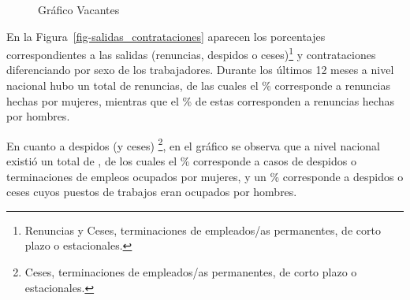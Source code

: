 \documentclass[
  11pt,
]{article}
\begin{document}
\begin{figure}[H]

\caption{\label{fig-vacantes}Gráfico Vacantes}


\end{figure}%

En la Figura~\ref{fig-salidas_contrataciones} aparecen los porcentajes
correspondientes a las salidas (renuncias, despidos o ceses)\footnote{Renuncias
  y Ceses, terminaciones de empleados/as permanentes, de corto plazo o
  estacionales.} y contrataciones diferenciando por sexo de los
trabajadores. Durante los últimos 12 meses a nivel nacional hubo un
total de  renuncias, de las cuales el \%
corresponde a renuncias hechas por mujeres, mientras que el
\% de estas corresponden a renuncias hechas por hombres.

En cuanto a despidos (y ceses) \footnote{Ceses, terminaciones de
  empleados/as permanentes, de corto plazo o estacionales.}, en el
gráfico se observa que a nivel nacional existió un total de
, de los cuales el \% corresponde a casos de
despidos o terminaciones de empleos ocupados por mujeres, y un
\% corresponde a despidos o ceses cuyos puestos de trabajos
eran ocupados por hombres.

\FloatBarrier
\end{document}
